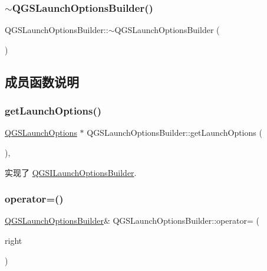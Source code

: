 \subsubsection{\texorpdfstring{$\sim$\+Q\+G\+S\+Launch\+Options\+Builder()}{~QGSLaunchOptionsBuilder()}}
{\footnotesize\ttfamily Q\+G\+S\+Launch\+Options\+Builder\+::$\sim$\+Q\+G\+S\+Launch\+Options\+Builder (\begin{DoxyParamCaption}{ }\end{DoxyParamCaption})\hspace{0.3cm}{\ttfamily [virtual]}}



\subsection{成员函数说明}
\mbox{\label{class_q_g_s_launch_options_builder_a9c8f5a5a47d197d3d1a7ba7c61b00a81}} 
\subsubsection{\texorpdfstring{get\+Launch\+Options()}{getLaunchOptions()}}
{\footnotesize\ttfamily \mbox{\hyperlink{class_q_g_s_launch_options}{Q\+G\+S\+Launch\+Options}} $\ast$ Q\+G\+S\+Launch\+Options\+Builder\+::get\+Launch\+Options (\begin{DoxyParamCaption}{ }\end{DoxyParamCaption})\hspace{0.3cm}{\ttfamily [override]}, {\ttfamily [virtual]}}



实现了 \mbox{\hyperlink{class_q_g_s_i_launch_options_builder_a10a7fef77cd4a56b2a9ec686d144a630}{Q\+G\+S\+I\+Launch\+Options\+Builder}}.

\mbox{\label{class_q_g_s_launch_options_builder_a0908e650dbb3d25d475892c9e68b89bd}} 
\subsubsection{\texorpdfstring{operator=()}{operator=()}\hspace{0.1cm}{\footnotesize\ttfamily [1/2]}}
{\footnotesize\ttfamily \mbox{\hyperlink{class_q_g_s_launch_options_builder}{Q\+G\+S\+Launch\+Options\+Builder}}\& Q\+G\+S\+Launch\+Options\+Builder\+::operator= (\begin{DoxyParamCaption}\item[{const \mbox{\hyperlink{class_q_g_s_launch_options_builder}{Q\+G\+S\+Launch\+Options\+Builder}} \&}]{right }\end{DoxyParamCaption})\hspace{0.3cm}{\ttfamily [delete]}}

